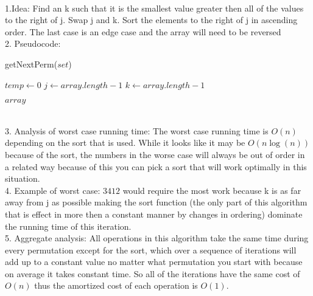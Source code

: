 \documentclass[11pt]{article}
\begin{document}
	\renewcommand{\headrulewidth}{0.4pt}
	\setlength{\headheight}{38.0pt}

	\\
	1.Idea: Find an k such that it is the smallest value greater then all of the values to the right of j.  Swap j and k. Sort the elements to the right of j in ascending order. The last case is an edge case and the array will need to be reversed\\
	2. Pseudocode:\\
		\begin{algorithm}[H]
				\NoCaptionOfAlgo
				\caption{getNextPerm($set$)}
				$temp \leftarrow 0$\;
				$j \leftarrow array.length-1$\;
				$k \leftarrow array.length-1$\;
				
				\Return $array$\;
		\end{algorithm}
		\noindent{}\\
	3. Analysis of worst case running time: The worst case running time is $O(n)$ depending on the sort that is used. While it looks like it may be $O(n\log(n))$ because of the sort, the numbers in the worse case will always be out of order in a related way because of this you can pick a sort that will work optimally in this situation.\\
	4. Example of worst case: $3 4 1 2$ would require the most work because k is as far away from j as possible making the sort function (the only part of this algorithm that is effect in more then a constant manner by changes in ordering) dominate the running time of this iteration.\\
	5. Aggregate analysis: All operations in this algorithm take the same time during every permutation except for the sort, which over a sequence of iterations will add up to a constant value no matter what permutation you start with because on average it takes constant time. So all of the iterations have the same cost of $O(n)$ thus the amortized cost of each operation is $O(1)$.\\
\end{document}
